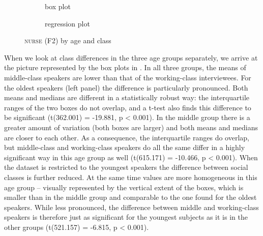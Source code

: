 \begin{figure}
	
	\begin{subfigure}{.49\textwidth}
		
			\resizebox{\linewidth}{!}{} 
		\caption{box plot}
		\label{fig.box.f2w.nurse.ageclass}
	\end{subfigure}
	\begin{subfigure}{.49\textwidth}
		
			\resizebox{\linewidth}{!}{} 
		\caption{regression plot}
		\label{fig.scatter.f2w.nurse.ageclass}
	\end{subfigure}
	\caption{\textsc{nurse} (F2) by age and class}
\end{figure}

\newpage 
When we look at class differences in the three age groups separately, we arrive at the picture represented by the box plots in .
In all three groups, the means of middle-class speakers are lower than that of the working-class interviewees.
For the oldest speakers (left panel) the difference is particularly pronounced.
Both means and medians are different in a statistically robust way: the interquartile ranges of the two boxes do not overlap, and a t-test also finds this difference to be significant (t(362.001) = -19.881, p < 0.001).
In the middle group there is a greater amount of variation (both boxes are larger) and both means and medians are closer to each other.
As a consequence, the interquartile ranges do overlap, but middle-class and working-class speakers do all the same differ in a highly significant way in this age group as well (t(615.171) = -10.466, p < 0.001).
When the dataset is restricted to the youngest speakers the difference between social classes is further reduced.
At the same time values are more homogeneous in this age group -- visually represented by the vertical extent of the boxes, which is smaller than in the middle group and comparable to the one found for the oldest speakers.
While less pronounced, the difference between middle and working-class speakers is therefore just as significant for the youngest subjects as it is in the other groups (t(521.157) = -6.815, p < 0.001).

